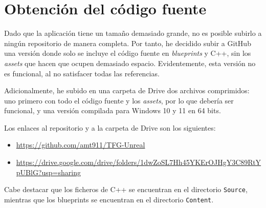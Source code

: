 \chapter{Obtención del código fuente}

Dado que la aplicación tiene un tamaño demasiado grande, no es posible subirlo a ningún repositorio de manera completa. Por tanto, he decidido subir a GitHub una versión donde solo se incluye el código fuente en \textit{blueprints} y C++, sin los \textit{assets} que hacen que ocupen demasiado espacio. Evidentemente, esta versión no es funcional, al no satisfacer todas las referencias.

\bigskip

Adicionalmente, he subido en una carpeta de Drive dos archivos comprimidos: uno primero con todo el código fuente y los \textit{assets}, por lo que debería ser funcional, y una versión compilada para Windows 10 y 11 en 64 bits.

\bigskip

Los enlaces al repositorio y a la carpeta de Drive son los siguientes:

\begin{itemize}
    \item \url{https://github.com/amt911/TFG-Unreal}
    \item \url{https://drive.google.com/drive/folders/1dwZoSL7Hh45YKErOJHgY3C89RtYpUBlG?usp=sharing}
\end{itemize}

\bigskip

Cabe destacar que los ficheros de C++ se encuentran en el directorio \texttt{Source}, mientras que los blueprints se encuentran en el directorio \texttt{Content}.